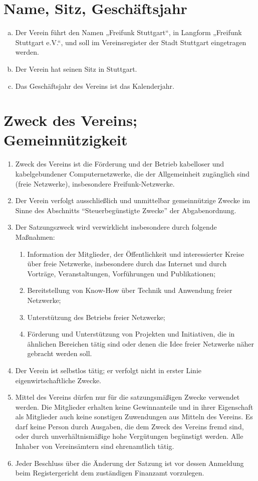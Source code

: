 \chapter{Name, Sitz, Geschäftsjahr}
\begin{enumerate}[a)]
	\item Der Verein führt den Namen „Freifunk Stuttgart“, in Langform „Freifunk Stuttgart e.V.“, und soll im Vereinsregister der Stadt Stuttgart eingetragen werden.
	\item Der Verein hat seinen Sitz in Stuttgart.
	\item Das Geschäftsjahr des Vereins ist das Kalenderjahr.
\end{enumerate}

\chapter{Zweck des Vereins; Gemeinnützigkeit}
\begin{enumerate}
	\item Zweck des Vereins ist die Förderung und der Betrieb kabelloser und kabelgebundener Computernetzwerke, die der Allgemeinheit zugänglich sind (freie Netzwerke), insbesondere Freifunk-Netzwerke.
	\item Der Verein verfolgt ausschließlich und unmittelbar gemeinnützige Zwecke im Sinne des Abschnitts “Steuerbegünstigte Zwecke” der Abgabenordnung.
	\item Der Satzungszweck wird verwirklicht insbesondere durch folgende Maßnahmen:
		\begin{enumerate}[1)]
			\item Information der Mitglieder, der Öffentlichkeit und interessierter Kreise über freie Netzwerke, insbesondere durch das Internet und durch Vorträge, Veranstaltungen, Vorführungen und Publikationen;
			\item Bereitstellung von Know-How über Technik und Anwendung freier Netzwerke;
			\item Unterstützung des Betriebs freier Netzwerke;
			\item Förderung und Unterstützung von Projekten und Initiativen, die in ähnlichen Bereichen tätig sind oder denen die Idee freier Netzwerke näher gebracht werden soll.
		\end{enumerate}
	\item Der Verein ist selbstlos tätig; er verfolgt nicht in erster Linie eigenwirtschaftliche Zwecke.
	\item Mittel des Vereins dürfen nur für die satzungsmäßigen Zwecke verwendet werden. Die Mitglieder erhalten keine Gewinnanteile und in ihrer Eigenschaft als Mitglieder auch keine sonstigen Zuwendungen aus Mitteln des Vereins. Es darf keine Person durch Ausgaben, die dem Zweck des Vereins fremd sind, oder durch unverhältnismäßige hohe Vergütungen begünstigt werden. Alle Inhaber von Vereinsämtern sind ehrenamtlich tätig.
	\item Jeder Beschluss über die Änderung der Satzung ist vor dessen Anmeldung beim Registergericht dem zuständigen Finanzamt vorzulegen.
\end{enumerate}

